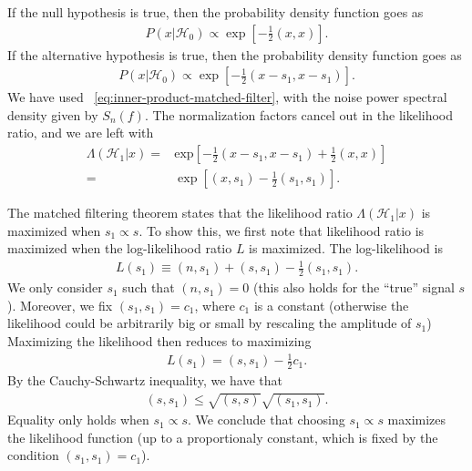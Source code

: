 If the null hypothesis is true, then the probability density function goes as
\begin{align}
    P\left(x|\mathcal{H}_0\right)
    \propto
    \exp\left[-\frac{1}{2}\left(x,x\right)\right]
    .
\end{align}
If the alternative hypothesis is true, then the probability density function
goes as 
\begin{align}
    P\left(x|\mathcal{H}_0\right)
    \propto
    \exp\left[-\frac{1}{2}\left(x-s_1,x-s_1\right)\right]
    .
\end{align}
We have used ~\eqref{eq:inner-product-matched-filter}, with the noise power spectral
density given by $S_n(f)$.
The normalization factors cancel out in the likelihood ratio, and we are left with
\begin{align}
    \Lambda\left(\mathcal{H}_1|x\right)
    =&
    \mathrm{exp}\left[
            - 
            \frac{1}{2} \left(x-s_1,x-s_1\right) + \frac{1}{2}\left(x,x\right)
        \right]
    \nonumber\\
    =&
    \exp\left[
             \left(x,s_1\right) - \frac{1}{2}\left(s_1,s_1\right) 
        \right]
    .
\end{align}

The matched filtering theorem states that the likelihood ratio 
$\Lambda\left(\mathcal{H}_1|x\right)$ is maximized when $s_1\propto s$.
To show this, we first note that likelihood ratio is maximized when the log-likelihood
ratio $L$ is maximized. The log-likelihood is
\begin{align}
    L\left(s_1\right)
    \equiv
    \left(n,s_1\right)
    +
    \left(s,s_1\right)
    -
    \frac{1}{2}\left(s_1,s_1\right)
    .
\end{align}
We only consider $s_1$ such that $\left(n,s_1\right)=0$
(this also holds for the ``true'' signal $s$).
Moreover, we fix $\left(s_1,s_1\right)=c_1$, where $c_1$ is a constant
(otherwise the likelihood could be arbitrarily big or small by rescaling the amplitude of $s_1$)
Maximizing the likelihood then reduces to maximizing
\begin{align}
    L\left(s_1\right)
    = 
    \left(s,s_1\right)
    -
    \frac{1}{2}c_1
    .
\end{align}
By the Cauchy-Schwartz inequality, we have that
\begin{align}
    \left(s,s_1\right)
    \leq 
    \sqrt{\left(s,s\right)}
    \sqrt{\left(s_1,s_1\right)}
    .
\end{align}
Equality only holds when $s_1\propto s$.
We conclude that choosing  $s_1\propto s$ 
maximizes the likelihood function (up to a proportionaly constant,
which is fixed by the condition $(s_1,s_1)=c_1$). 


